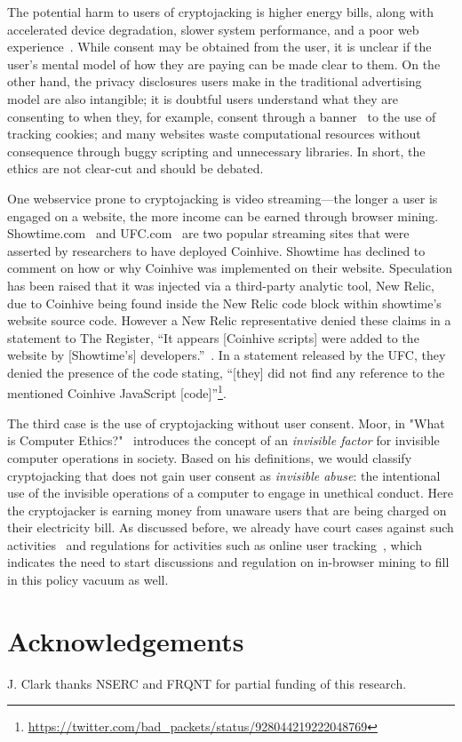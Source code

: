 The potential harm to users of cryptojacking is higher energy bills, along with accelerated device degradation, slower system performance, and a poor web experience~\cite{httparchiveminingimpact,gaurdianelectricity}. While consent may be obtained from the user, it is unclear if the user's mental model of how they are paying can be made clear to them. On the other hand, the privacy disclosures users make in the traditional advertising model are also intangible; it is doubtful users understand what they are consenting to when they, for example, consent through a banner~\cite{eucookie} to the use of tracking cookies; and many websites waste computational resources without consequence through buggy scripting and unnecessary libraries. In short, the ethics are not clear-cut and should be debated. 

One webservice prone to cryptojacking is video streaming---the longer a user is engaged on a website, the more income can be earned through browser mining. Showtime.com~\cite{registershowtime} and UFC.com~\cite{registerufcmonero} are two popular streaming sites that were asserted by researchers to have deployed Coinhive. Showtime has declined to comment on how or why Coinhive was implemented on their website. Speculation has been raised that it was injected via a third-party analytic tool, New Relic, due to Coinhive being found inside the New Relic code block within showtime's website source code. However a New Relic representative denied these claims in a statement to The Register, ``It appears [Coinhive scripts] were added to the website by [Showtime's] developers.''~\cite{registershowtime}. In a statement released by the UFC, they denied the presence of the code stating, ``[they] did not find any reference to the mentioned Coinhive JavaScript [code]''\footnote{\url{https://twitter.com/bad_packets/status/928044219222048769}}.

The third case is the use of cryptojacking without user consent. Moor, in "What is Computer Ethics?"~\cite{moor1985computer} introduces the concept of an \textit{invisible factor} for invisible computer operations in society. Based on his definitions, we would classify cryptojacking that does not gain user consent as \textit{invisible abuse}: the intentional use of the invisible operations of a computer to engage in unethical conduct. Here the cryptojacker is earning money from unaware users that are being charged on their electricity bill. As discussed before, we already have court cases against such activities~\cite{njcourtbitcoinjsminer} and regulations for activities such as online user tracking~\cite{eucookie}, which indicates the need to start discussions and regulation on in-browser mining to fill in this policy vacuum as well. 


\section{Acknowledgements}

J. Clark thanks NSERC and FRQNT for partial funding of this research. 

















